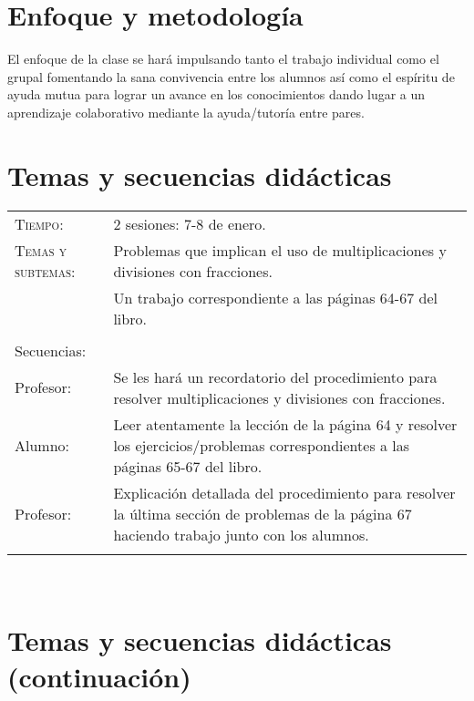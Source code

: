 \documentclass[letterpaper,10pt]{article}
\begin{document}
\vfill

\section{Enfoque y metodolog\'ia}

El enfoque de la clase se har\'a impulsando tanto el trabajo individual como el 
grupal fomentando la sana convivencia entre los alumnos as\'i como el esp\'iritu
de ayuda mutua para lograr un avance en los conocimientos dando lugar a un 
aprendizaje colaborativo mediante la ayuda/tutor\'ia entre pares.

\vfill

\section{Temas  y secuencias did\'acticas}
\begin{tabular}[t]{R{0.25\textwidth}p{0.71\textwidth}}
    \textsc{Tiempo:}          & 2 sesiones: 7-8 de enero. \\
    \textsc{Temas y subtemas:}& Problemas que implican el uso de 
    multiplicaciones y divisiones con fracciones.\\
    & Un trabajo correspondiente a las 
    p\'aginas 64-67 del libro. \\ \\
    \large{\sc Secuencias:} \\
    Profesor:   & Se les har\'a un recordatorio del procedimiento para resolver 
    multiplicaciones y divisiones con fracciones. \\
    Alumno:     & Leer atentamente la lecci\'on de la p\'agina 64 y resolver los 
    ejercicios/problemas correspondientes a las p\'aginas 65-67 del libro. \\
    Profesor: & Explicación detallada del procedimiento para resolver la \'ultima
    secci\'on de problemas de la p\'agina 67 haciendo trabajo junto con los 
    alumnos. \\ \\
\hline
\end{tabular}
\\
\newpage
\section{Temas  y secuencias did\'acticas (continuaci\'on)}
\end{document}

